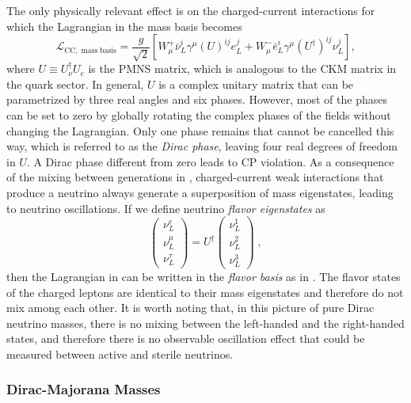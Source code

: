 The only physically relevant effect is on the charged-current interactions for which the Lagrangian in the mass basis becomes
\begin{equation}
    \mathcal{L}_\mathrm{CC,\;mass\;basis} = \frac{g}{\sqrt{2}}
    \left[
        W^+_\mu \bar{\nu}_L^i \gamma^\mu (U)^{ij} e_L^j
        + W^-_\mu \bar{e}_L^i \gamma^\mu (U^\dag)^{ij} \nu_L^j
    \right],\label{eq:lag-cc-mass-basis}
\end{equation}
where $U\equiv U_\nu^\dag U_e$ is the PMNS matrix, which is analogous to the CKM matrix in the quark sector.
In general, $U$ is a complex unitary matrix that can be parametrized by three real angles and six phases.
However, most of the phases can be set to zero by globally rotating the complex phases of the fields without changing the Lagrangian.
Only one phase remains that cannot be cancelled this way, which is referred to as the \emph{Dirac phase}, leaving four real degrees of freedom in $U$.
A Dirac phase different from zero leads to CP violation.
As a consequence of the mixing between generations in , charged-current weak interactions that produce a neutrino always generate a superposition of mass eigenstates, leading to neutrino oscillations.
If we define neutrino \emph{flavor eigenstates} as
\begin{equation}
    \begin{pmatrix}
        \nu_{L}^e \\
        \nu_{L}^\mu \\
        \nu_{L}^\tau
    \end{pmatrix}
    = U^\dag
    \begin{pmatrix}
        \nu_{L}^1 \\
        \nu_{L}^2 \\
        \nu_{L}^3
    \end{pmatrix}\;,
\end{equation}
then the Lagrangian in  can be written in the \emph{flavor basis} as in .
The flavor states of the charged leptons are identical to their mass eigenstates and therefore do not mix among each other.
It is worth noting that, in this picture of pure Dirac neutrino masses, there is no mixing between the left-handed and the right-handed states, and therefore there is no observable oscillation effect that could be measured between active and sterile neutrinos.

\subsubsection{Dirac-Majorana Masses}

